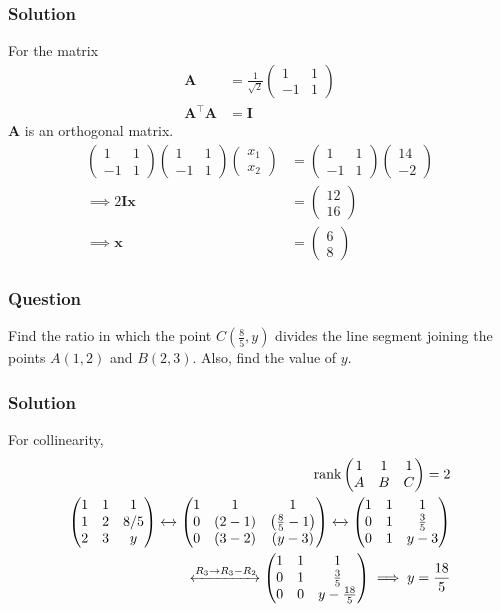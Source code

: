 \documentclass{beamer}
\providecommand{\brak}[1]{\ensuremath{\left(#1\right)}}
\theoremstyle{remark}
\newcommand{\myvec}[1]{\ensuremath{\begin{pmatrix}#1\end{pmatrix}}}
\let\vec\mathbf
\begin{document}
\begin{frame}
\frametitle{Solution}
For the matrix
    \begin{align}
	    \vec{A}&=\frac{1}{\sqrt{2}}\myvec{
        1 & 1\\
        -1 & 1
    }\\
	    \vec{A}^\top \vec{A}&= \vec{I}    
    \end{align}
$\vec{A}$ is an orthogonal matrix.
    \begin{align}
            \myvec{
        1 & 1\\
        -1 & 1
    }
    \myvec{
        1 & 1\\
        -1 & 1
    }
    \myvec{
        x_1\\
        x_2
    } &= 
    \myvec{
        1 & 1\\
        -1 & 1
    }
    \myvec{
        14\\
        -2
    } \\
\implies    2\vec{I}\vec{x} &= \myvec{
        12\\
        16
    }\\
    \implies \vec{x} &= \myvec{
        6\\
        8
    }
\end{align}
\end{frame}
%
\begin{frame}
\frametitle{Question }
Find the ratio in which the point $C\brak{\frac{8}{5},y}$ divides the line segment joining the points $A\brak{1,2}$ and $B\brak{2,3}$. Also, find the value of $y$. 
\end{frame}
%
\begin{frame}
\frametitle{Solution}
    For collinearity,
    \begin{align}
          \text{rank}\myvec{
        1 & 1 & 1\\
        A & B & C
    } =2 \label{10}\\
    \myvec{
        1 & 1 & 1\\
        1 & 2 & 8/5\\
        2 & 3 & y
    } \xleftrightarrow{}
    \myvec{
        1 & 1 & 1\\
        0 & \brak{2-1} & \brak{\frac{8}{5}-1}\\
        0 & \brak{3-2} & \brak{y-3}
    }\xleftrightarrow{}
    \myvec{
        1 & 1 & 1\\
        0 & 1 & \frac{3}{5}\\
        0 & 1 & y-3
    }
    \\
    \xleftrightarrow{R_3\rightarrow R_3-R_2}
    \myvec{
        1 & 1 & 1\\
        0 & 1 & \frac{3}{5}\\
        0 & 0 & y-\frac{18}{5}
    }
    \implies y = \frac{18}{5}
\end{align}
\end{frame}
\end{document}
